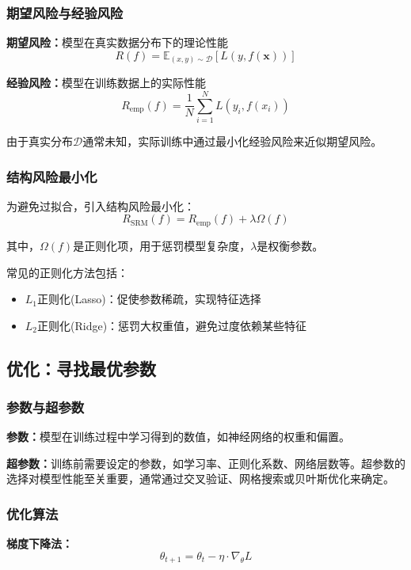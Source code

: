 \subsubsection{期望风险与经验风险}

\textbf{期望风险：}模型在真实数据分布下的理论性能
$$R(f) = \mathbb{E}_{(x,y)\sim \mathcal{D}}[L(y, f(\mathbf{x}))]$$

\textbf{经验风险：}模型在训练数据上的实际性能
$$R_{\text{emp}}(f) = \frac{1}{N} \sum_{i=1}^N L(y_i, f(x_i))$$

由于真实分布$\mathcal{D}$通常未知，实际训练中通过最小化经验风险来近似期望风险。

\subsubsection{结构风险最小化}

为避免过拟合，引入结构风险最小化：
$$R_{\text{SRM}}(f) = R_{\text{emp}}(f) + \lambda \Omega(f)$$

其中，$\Omega(f)$是正则化项，用于惩罚模型复杂度，$\lambda$是权衡参数。

常见的正则化方法包括：
\begin{itemize}
\item $L_1$正则化(Lasso)：促使参数稀疏，实现特征选择
\item $L_2$正则化(Ridge)：惩罚大权重值，避免过度依赖某些特征
\end{itemize}

\subsection{优化：寻找最优参数}

\subsubsection{参数与超参数}

\textbf{参数：}模型在训练过程中学习得到的数值，如神经网络的权重和偏置。

\textbf{超参数：}训练前需要设定的参数，如学习率、正则化系数、网络层数等。超参数的选择对模型性能至关重要，通常通过交叉验证、网格搜索或贝叶斯优化来确定。

\subsubsection{优化算法}

\textbf{梯度下降法：}
$$\theta_{t+1} = \theta_t - \eta \cdot \nabla_\theta L$$

